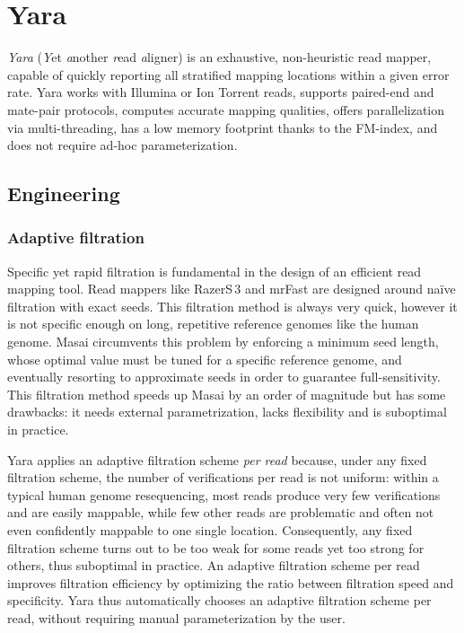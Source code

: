 \chapter{Yara}
\label{sec:yara}

\emph{Yara} (\emph{Y}et \emph{a}nother \emph{r}ead \emph{a}ligner) is an exhaustive, non-heuristic read mapper, capable of quickly reporting all stratified mapping locations within a given error rate.
Yara works with Illumina or Ion Torrent reads, supports paired-end and mate-pair protocols, computes accurate mapping qualities, offers parallelization via multi-threading, has a low memory footprint thanks to the FM-index, and does not require ad-hoc parameterization.


\section{Engineering}
\label{sec:yara:eng}

\subsection{Adaptive filtration}
\label{sec:yara:eng:adaptive}

Specific yet rapid filtration is fundamental in the design of an efficient read mapping tool.
Read mappers like RazerS\,3 \citep{Weese2012} and mrFast \citep{Ahmadi2012} are designed around na\"ive filtration with exact seeds.
This filtration method is always very quick, however it is not specific enough on long, repetitive reference genomes like the human genome.
Masai \citep{Siragusa2013} circumvents this problem by enforcing a minimum seed length,
whose optimal value must be tuned for a specific reference genome, and eventually resorting to approximate seeds in order to guarantee full-sensitivity.
This filtration method speeds up Masai by an order of magnitude but has some drawbacks:
it needs external parametrization, lacks flexibility and is suboptimal in practice.

Yara applies an adaptive filtration scheme \emph{per read} because, under any fixed filtration scheme, the number of verifications per read is not uniform: within a typical human genome resequencing, most reads produce very few verifications and are easily mappable, while few other reads are problematic and often not even confidently mappable to one single location.
Consequently, any fixed filtration scheme turns out to be too weak for some reads yet too strong for others, thus suboptimal in practice.
An adaptive filtration scheme per read improves filtration efficiency by optimizing the ratio between filtration speed and specificity.
Yara thus automatically chooses an adaptive filtration scheme per read, without requiring manual parameterization by the user.

